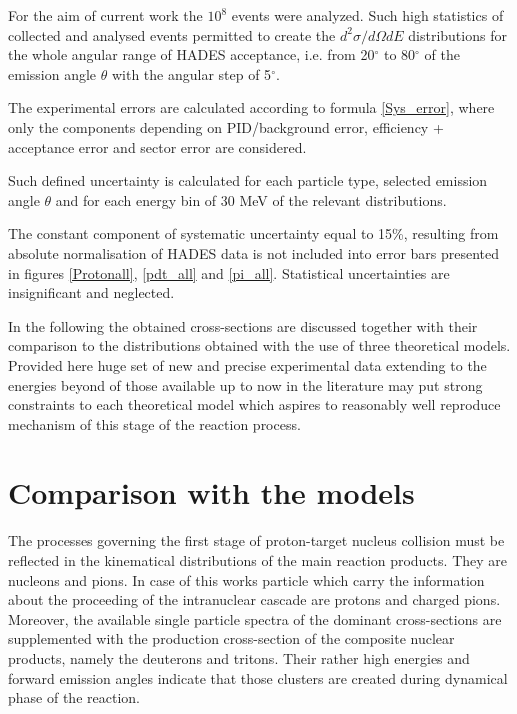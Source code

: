 For the aim of current work the $10^8$ events were analyzed. 
Such high statistics of collected and analysed  events permitted to create the $d^2\sigma/d\Omega dE$ distributions for the whole angular range of HADES acceptance, i.e. from 20$^{\circ}$ to 80$^{\circ}$ of the emission angle $\theta$ with the angular step of 5$^{\circ}$. 

The experimental errors are calculated according to formula \ref{Sys_error}, where only the components depending on PID/background error, efficiency + acceptance error and sector error are considered.

Such defined uncertainty is calculated for each particle type, selected emission angle $\theta$ and for each energy bin of 30 MeV of the relevant distributions.

The constant component of systematic uncertainty equal to 15\%, resulting from absolute normalisation of HADES data is not included into error bars presented in figures \ref{Protonall}, \ref{pdt_all} and \ref{pi_all}. 
Statistical uncertainties are insignificant and neglected.

In the following the obtained cross-sections are discussed together with their comparison 
to the distributions obtained with the use of three theoretical models. 
Provided here huge set of new and precise experimental data extending to the energies beyond of those available up to now in the literature may put strong 
constraints to each theoretical model which aspires to reasonably
well reproduce mechanism of this stage of the reaction process.



\section{Comparison with the models}
\label{comp_HADES_models}

The processes governing the first stage of proton-target nucleus collision must be reflected in the kinematical distributions of the main reaction products. They are nucleons and pions.
In case of this works particle which carry the information about the proceeding of the intranuclear cascade are protons and charged pions. Moreover, the available single particle 
spectra of the dominant cross-sections are supplemented with the production cross-section of the composite nuclear products, namely the deuterons and tritons. Their rather high energies and forward emission angles indicate that those clusters are created during dynamical phase of the reaction.  

